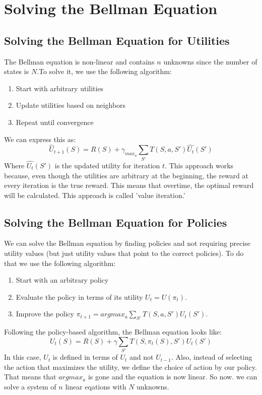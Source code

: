 \documentclass{article}
\begin{document}
\section{Solving the Bellman Equation}
\subsection{Solving the Bellman Equation for Utilities}
The Bellman equation is non-linear and contains $n$ unknowns since the number of states is $N$.To solve it, we use the following algorithm:
  \begin{enumerate}
    \item Start with arbitrary utilities
    \item Update utilities based on neighbors
    \item Repeat until convergence
  \end{enumerate}
We can express this as:
\begin{equation}
  \hat{U}_{t + 1}(S) = R(S) + \gamma_{max_a} \sum_{S'} T(S, a, S') \hat{U_t}(S')
\end{equation}
Where $\hat{U_t}(S')$ is the updated utility for iteration $t$. This approach works because, even though the utilities are arbitrary at the beginning, the reward at every iteration is the true reward. This means that overtime, the optimal reward will be calculated. This approach is called 'value iteration.'
\subsection{Solving the Bellman Equation for Policies}
We can solve the Bellman equation by finding policies and not requiring precise utility values (but just utility values that point to the correct policies). To do that we use the following algorithm:
\begin{enumerate}
  \item Start with an arbitrary policy
  \item Evaluate the policy in terms of its utility $U_t = U(\pi_t)$.
  \item Improve the policy $\pi_{t + 1} = argmax_a \sum_{S'} T(S, a, S') U_t(S')$.
\end{enumerate}
Following the policy-based algorithm, the Bellman equation looks like:
\begin{equation}
  U_t(S) = R(S) + \gamma \sum_{S'} T(S, \pi_t(S), S') U_t(S')
\end{equation}
In this case, $U_t$ is defined in terms of $U_t$ and not $U_{t - 1}$. Also, instead of selecting the action that maximizes the utility, we define the choice of action by our policy. That means that $argmax_a$ is gone and the equation is now linear. So now. we can solve a system of $n$ linear eqations with $N$ unknowns.
\end{document}
